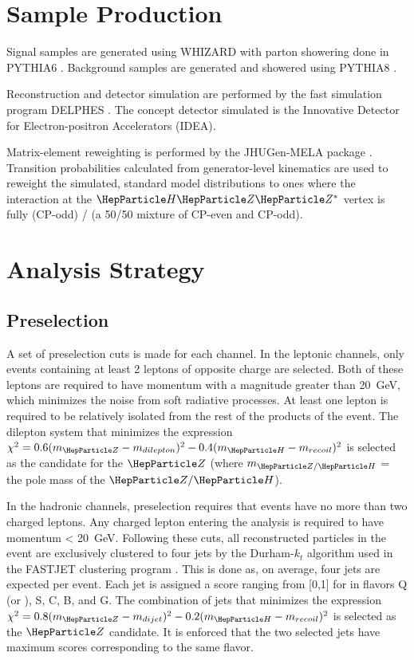 \section{Sample Production}
Signal samples are generated using WHIZARD \cite{Kilian:2011vkz} with parton showering done in PYTHIA6 \cite{Sjostrand:2006qrn}. Background samples are generated and showered using PYTHIA8 \cite{Sjostrand:2015oiw}. 

Reconstruction and detector simulation are performed by the fast simulation program DELPHES \cite{deFavereau:2014ald}. The concept detector simulated is the Innovative Detector for Electron-positron Accelerators (IDEA). 

Matrix-element reweighting is performed by the JHUGen-MELA package \cite{Gao:2010xkx, Bolognesi:2012hxo, Chen:2013elb}. Transition probabilities calculated from generator-level kinematics are used to reweight the simulated, standard model distributions to ones where the interaction at the $\PH\PZ\PZ^*$ vertex is fully (CP-odd) / (a 50/50 mixture of CP-even and CP-odd). 

\section{Analysis Strategy}
\subsection{Preselection}
A set of preselection cuts is made for each channel. In the leptonic channels, only events containing at least 2 leptons of opposite charge are selected. Both of these leptons are required to have momentum with a magnitude greater than \SI{20}{\giga\electronvolt}, which minimizes the noise from soft radiative processes. At least one lepton is required to be relatively isolated from the rest of the products of the event. The dilepton system that minimizes the expression $\chi^2 = 0.6(m_{\PZ} - m_{dilepton})^2 - 0.4(m_{\PH} - m_{recoil})^2$ is selected as the candidate for the $\PZ$ (where $m_{\PZ/\PH}$ = the pole mass of the $\PZ/\PH$). 

In the hadronic channels, preselection requires that events have no more than two charged leptons. Any charged lepton entering the analysis is required to have momentum < \SI{20}{\giga\electronvolt}. Following these cuts, all reconstructed particles in the event are exclusively clustered to four jets by the Durham-$k_t$ algorithm \cite{Catani:1991mxc} used in the FASTJET clustering program \cite{Cacciari:2012nja}. This is done as, on average, four jets are expected per event. Each jet is assigned a score ranging from [0,1] for in flavors Q (\PQu or \PQd), S, C, B, and G. The combination of jets that minimizes the expression $\chi^2 = 0.8(m_{\PZ} - m_{dijet})^2 - 0.2(m_{\PH} - m_{recoil})^2$ is selected as the $\PZ$ candidate. It is enforced that the two selected jets have maximum scores corresponding to the same flavor. 

